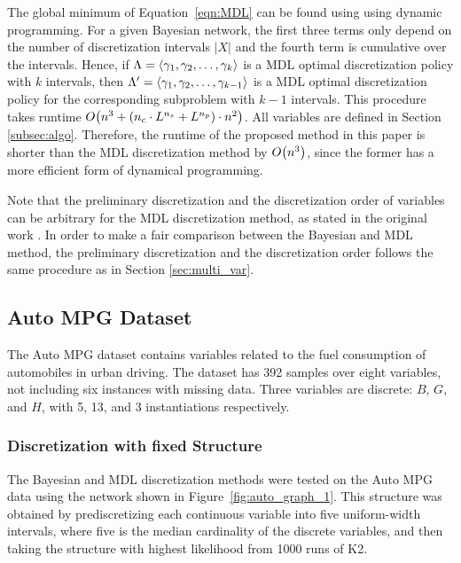 The global minimum of Equation~\ref{eqn:MDL} can be found using using dynamic programming.
For a given Bayesian network, the first three terms only depend on the number of discretization intervals $|X|$ and the fourth term is cumulative over the intervals.
Hence, if $\Lambda = \langle \gamma_1, \gamma_2, \ldots, \gamma_k \rangle$ is a MDL optimal discretization policy with $k$ intervals, then $\Lambda' = \langle \gamma_1, \gamma_2, \ldots, \gamma_{k-1} \rangle$ is a MDL optimal discretization policy for the corresponding subproblem with $k-1$ intervals.
This procedure takes runtime $\bigo \paren{ n^3 + \paren{ n_c \cdot {L}^{n_s}  + {L}^{n_p}} \cdot n^2 }$.
All variables are defined in Section \ref{subsec:algo}.
Therefore, the runtime of the proposed method in this paper is shorter than the MDL discretization method by $\bigo \paren{n^3}$, since the former has a more efficient form of dynamical programming.

Note that the preliminary discretization and the discretization order of variables can be arbitrary for the MDL discretization method, as stated in the original work \citep{Friedman_1996}. In order to make a fair comparison between the Bayesian and MDL method, the preliminary discretization and the discretization order follows the same procedure as in Section \ref{sec:multi_var}.

\subsection{Auto MPG Dataset}
\label{subsec:auto}

The Auto MPG dataset contains variables related to the fuel consumption of automobiles in urban driving.
The dataset has \num{392} samples over eight variables, not including six instances with missing data.
Three variables are discrete: $B$, $G$, and $H$, with \num{5}, \num{13}, and \num{3} instantiations respectively.

\subsubsection{Discretization with fixed Structure}
\label{subsubsec:auto_exp1}

The Bayesian and MDL discretization methods were tested on the Auto MPG data using the network shown in Figure~\ref{fig:auto_graph_1}.
This structure was obtained by prediscretizing each continuous variable into five uniform-width intervals, where five is the median cardinality of the discrete variables, and then taking the structure with highest likelihood from \num{1000} runs of K2.

